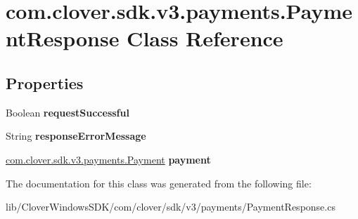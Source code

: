 \hypertarget{classcom_1_1clover_1_1sdk_1_1v3_1_1payments_1_1_payment_response}{}\section{com.\+clover.\+sdk.\+v3.\+payments.\+Payment\+Response Class Reference}
\label{classcom_1_1clover_1_1sdk_1_1v3_1_1payments_1_1_payment_response}
\subsection*{Properties}
\begin{DoxyCompactItemize}
\item 
\mbox{\label{classcom_1_1clover_1_1sdk_1_1v3_1_1payments_1_1_payment_response_a193f43a3b183e43a65c454507ce76620}} 
Boolean {\bfseries request\+Successful}
\item 
\mbox{\label{classcom_1_1clover_1_1sdk_1_1v3_1_1payments_1_1_payment_response_a0acd3c1ee0af687821b0686277282c36}} 
String {\bfseries response\+Error\+Message}
\item 
\mbox{\label{classcom_1_1clover_1_1sdk_1_1v3_1_1payments_1_1_payment_response_a5587a13c66d658640a6acea45719558d}} 
\hyperlink{classcom_1_1clover_1_1sdk_1_1v3_1_1payments_1_1_payment}{com.\+clover.\+sdk.\+v3.\+payments.\+Payment} {\bfseries payment}
\end{DoxyCompactItemize}


The documentation for this class was generated from the following file\+:\begin{DoxyCompactItemize}
\item 
lib/\+Clover\+Windows\+S\+D\+K/com/clover/sdk/v3/payments/Payment\+Response.\+cs\end{DoxyCompactItemize}
